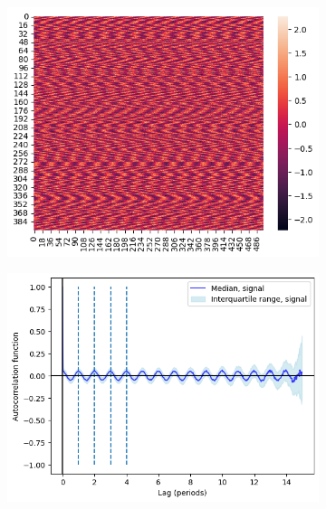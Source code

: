 \begin{figure}
  \begin{subfigure}[t]{0.45\textwidth}
  \centering
    \includegraphics[width=\linewidth]{noisysinusoids_outofphase}
    \caption{
    }
    \label{fig:acf-sinusoids-gausnoise-ts}
  \end{subfigure}%
  \centering
  \begin{subfigure}[t]{0.4\textwidth}
  \centering
    \includegraphics[width=\linewidth]{verynoisysinusoids_outofphase_acf}
    \caption{
    }
    \label{fig:acf-sinusoids-gausnoise-acf}
  \end{subfigure}


\end{figure}
